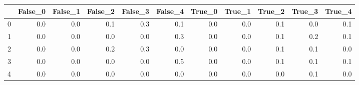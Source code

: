 \begin{tabular}{lrrrrrrrrrr}
\toprule
{} &  False\_0 &  False\_1 &  False\_2 &  False\_3 &  False\_4 &  True\_0 &  True\_1 &  True\_2 &  True\_3 &  True\_4 \\ \hline
\midrule
0 &      0.0 &      0.0 &      0.1 &      0.3 &      0.1 &     0.0 &     0.0 &     0.1 &     0.0 &     0.1 \\ \hline
1 &      0.0 &      0.0 &      0.0 &      0.0 &      0.3 &     0.0 &     0.0 &     0.1 &     0.2 &     0.1 \\ \hline
2 &      0.0 &      0.0 &      0.2 &      0.3 &      0.0 &     0.0 &     0.0 &     0.1 &     0.1 &     0.0 \\ \hline
3 &      0.0 &      0.0 &      0.0 &      0.0 &      0.5 &     0.0 &     0.0 &     0.1 &     0.1 &     0.1 \\ \hline
4 &      0.0 &      0.0 &      0.0 &      0.0 &      0.0 &     0.0 &     0.0 &     0.0 &     0.1 &     0.0 \\ \hline
\bottomrule
\end{tabular}
